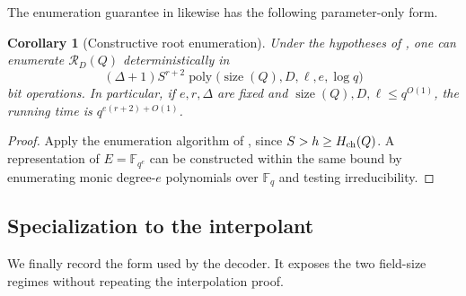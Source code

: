 \documentclass[11pt,letterpaper]{article}
\newtheorem{corollary}[corollary]{Corollary}
\theoremstyle{definition}
\newcommand{\F}{\mathbb{F}}
\newcommand{\poly}{\operatorname{poly}}
\begin{document}
The enumeration guarantee in  likewise has the
following parameter-only form.

\begin{corollary}[Constructive root enumeration]
\label{cor:root-enumeration}
Under the hypotheses of , one can enumerate
\(\mathcal R_D(Q)\) deterministically in
\begin{equation}
  (\Delta+1)S^{r+2}
  \poly\bigl(\operatorname{size}(Q),D,\ell,e,\log q\bigr)
  \label{eq:root-enumeration-runtime}
\end{equation}
bit operations. In particular, if \(e,r,\Delta\) are fixed and
\(\operatorname{size}(Q),D,\ell\le q^{O(1)}\), the running time is
\(q^{e(r+2)+O(1)}\).
\end{corollary}

\begin{proof}
Apply the enumeration algorithm of , since
$S>h\ge H_{\rm ch}(Q)$. A representation of $E=\F_{q^e}$ can be
constructed within the same bound by enumerating monic degree-$e$
polynomials over $\F_q$ and testing irreducibility.
\end{proof}

\subsection{Specialization to the interpolant}

We finally record the form used by the decoder.  It exposes the two
field-size regimes without repeating the interpolation proof.
\end{document}

